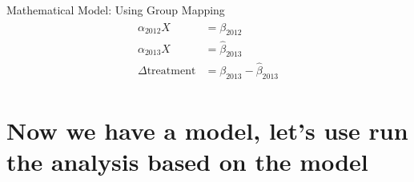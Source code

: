 \documentclass{beamer}
\begin{document}
\begin{frame}{Mathematical Model: Using Group Mapping}
  \begin{align}
    \begin{split}
        \alpha_{2012} X &= \beta_{2012} \\
        \alpha_{2013} X &= \hat\beta_{2013} \\
        \Delta\mbox{treatment} &= \beta_{2013} - \hat\beta_{2013}
    \end{split}
  \end{align}
\end{frame}

\section{Now we have a model, let's use run the analysis based on the model}
\end{document}
